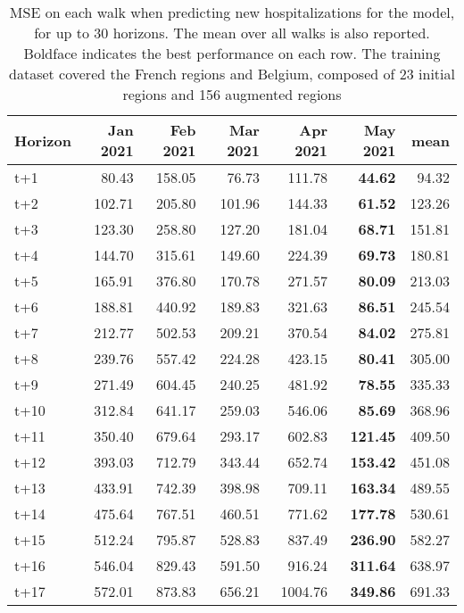 \begin{table}[H]
\centering
\caption{MSE on each walk when predicting new hospitalizations for the model, for up to 30 horizons. The mean over all walks is also reported. Boldface indicates the best performance on each row. The training dataset covered the French regions and Belgium, composed of 23 initial regions and 156 augmented regions }
\label{tab:MSE_walk_custom_linear_regression}
\begin{tabular}{lrrrrrr}
\toprule
Horizon &  Jan 2021 &  Feb 2021 &  Mar 2021 &  Apr 2021 &  May 2021 &    mean \\
\midrule
t+1  & 80.43  & 158.05  & 76.73  & 111.78  & \textbf{44.62}  & 94.32  \\
t+2  & 102.71  & 205.80  & 101.96  & 144.33  & \textbf{61.52}  & 123.26  \\
t+3  & 123.30  & 258.80  & 127.20  & 181.04  & \textbf{68.71}  & 151.81  \\
t+4  & 144.70  & 315.61  & 149.60  & 224.39  & \textbf{69.73}  & 180.81  \\
t+5  & 165.91  & 376.80  & 170.78  & 271.57  & \textbf{80.09}  & 213.03  \\
t+6  & 188.81  & 440.92  & 189.83  & 321.63  & \textbf{86.51}  & 245.54  \\
t+7  & 212.77  & 502.53  & 209.21  & 370.54  & \textbf{84.02}  & 275.81  \\
t+8  & 239.76  & 557.42  & 224.28  & 423.15  & \textbf{80.41}  & 305.00  \\
t+9  & 271.49  & 604.45  & 240.25  & 481.92  & \textbf{78.55}  & 335.33  \\
t+10  & 312.84  & 641.17  & 259.03  & 546.06  & \textbf{85.69}  & 368.96  \\
t+11  & 350.40  & 679.64  & 293.17  & 602.83  & \textbf{121.45}  & 409.50  \\
t+12  & 393.03  & 712.79  & 343.44  & 652.74  & \textbf{153.42}  & 451.08  \\
t+13  & 433.91  & 742.39  & 398.98  & 709.11  & \textbf{163.34}  & 489.55  \\
t+14  & 475.64  & 767.51  & 460.51  & 771.62  & \textbf{177.78}  & 530.61  \\
t+15  & 512.24  & 795.87  & 528.83  & 837.49  & \textbf{236.90}  & 582.27  \\
t+16  & 546.04  & 829.43  & 591.50  & 916.24  & \textbf{311.64}  & 638.97  \\
t+17  & 572.01  & 873.83  & 656.21  & 1004.76  & \textbf{349.86}  & 691.33  \\

\end{tabular}
\end{table}
